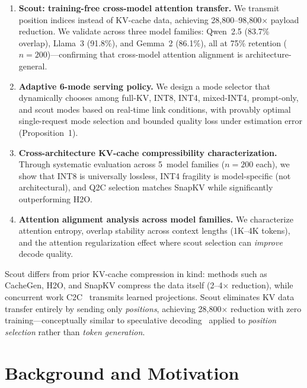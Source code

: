 \documentclass{article}
\newcommand{\QtoC}{\textsc{Q2C}\xspace}
\begin{document}
\begin{enumerate}
    \item \textbf{Scout: training-free cross-model attention transfer.} We transmit position indices instead of KV-cache data, achieving 28{,}800--98{,}800$\times$ payload reduction. We validate across three model families: Qwen~2.5 (83.7\% overlap), Llama~3 (91.8\%), and Gemma~2 (86.1\%), all at 75\% retention ($n = 200$)---confirming that cross-model attention alignment is architecture-general.

    \item \textbf{Adaptive 6-mode serving policy.} We design a mode selector that dynamically chooses among full-KV, INT8, INT4, mixed-INT4, prompt-only, and scout modes based on real-time link conditions, with provably optimal single-request mode selection and bounded quality loss under estimation error (Proposition~1).

    \item \textbf{Cross-architecture KV-cache compressibility characterization.} Through systematic evaluation across 5~model families ($n = 200$ each), we show that INT8 is universally lossless, INT4 fragility is model-specific (not architectural), and \QtoC selection matches SnapKV while significantly outperforming H2O.

    \item \textbf{Attention alignment analysis across model families.} We characterize attention entropy, overlap stability across context lengths (1K--4K tokens), and the attention regularization effect where scout selection can \emph{improve} decode quality.
\end{enumerate}

Scout differs from prior KV-cache compression in kind: methods such as CacheGen, H2O, and SnapKV compress the data itself (2--4$\times$ reduction), while concurrent work C2C~\citep{c2c} transmits learned projections.
Scout eliminates KV data transfer entirely by sending only \emph{positions}, achieving 28{,}800$\times$ reduction with zero training---conceptually similar to speculative decoding~\citep{speculativedecoding} applied to \emph{position selection} rather than \emph{token generation}.

\section{Background and Motivation}
\label{sec:background}
\end{document}
